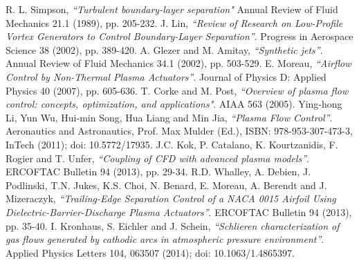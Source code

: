 \documentclass[10pt,a4paper]{article}
\begin{document}
\begin{thebibliography}{99}

	R. L. Simpson, \emph{``Turbulent boundary-layer separation"} Annual Review of Fluid Mechanics 21.1 (1989), pp. 205-232.‏
	J. Lin, \emph{ ``Review of Research on Low-Profile Vortex Generators to Control Boundary-Layer Separation''}. Progress in Aerospace Science 38 (2002), pp. 389-420.
	A. Glezer and M. Amitay, \emph{``Synthetic jets''}. Annual Review of Fluid Mechanics 34.1 (2002), pp. 503-529.‏
	E. Moreau, \emph{ ``Airflow Control by Non-Thermal Plasma Actuators''}. Journal of Physics D: Applied Physics 40 (2007), pp. 605-636.
	T. Corke and M. Post, \emph{``Overview of plasma flow control: concepts, optimization, and applications"}. AIAA 563 (2005).‏
	Ying-hong Li, Yun Wu, Hui-min Song, Hua Liang and Min Jia, \emph{``Plasma Flow Control''}. Aeronautics and Astronautics, Prof. Max Mulder (Ed.), ISBN: 978-953-307-473-3, InTech (2011); doi: 10.5772/17935. 
	J.C. Kok, P. Catalano, K. Kourtzanidis, F. Rogier and T. Unfer, \emph{``Coupling of CFD with advanced plasma models''}. ERCOFTAC Bulletin 94 (2013), pp. 29-34.
	R.D. Whalley, A. Debien, J. Podlinski, T.N. Jukes, K.S. Choi, N. Benard, E. Moreau, A. Berendt and J. Mizeraczyk, \emph{``Trailing-Edge Separation Control of a NACA 0015 Airfoil Using Dielectric-Barrier-Discharge Plasma Actuators''}. ERCOFTAC Bulletin 94 (2013), pp. 35-40.
	I. Kronhaus, S. Eichler and J. Schein,
	\emph{``Schlieren characterization of gas flows generated by cathodic arcs in atmospheric pressure environment”}. Applied Physics Letters 104, 063507 (2014); doi: 10.1063/1.4865397.
  

\end{thebibliography}
\end{document}
